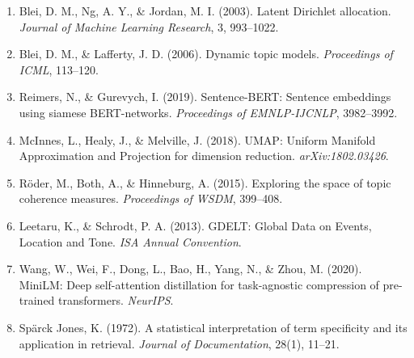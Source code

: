 \documentclass[12pt,a4paper]{article}
\begin{document}
\begin{enumerate}[leftmargin=2em]
    \item Blei, D. M., Ng, A. Y., \& Jordan, M. I. (2003). Latent Dirichlet allocation.
          \textit{Journal of Machine Learning Research}, 3, 993--1022.

    \item Blei, D. M., \& Lafferty, J. D. (2006). Dynamic topic models.
          \textit{Proceedings of ICML}, 113--120.

    \item Reimers, N., \& Gurevych, I. (2019). Sentence-BERT: Sentence embeddings using
          siamese BERT-networks. \textit{Proceedings of EMNLP-IJCNLP}, 3982--3992.

    \item McInnes, L., Healy, J., \& Melville, J. (2018). UMAP: Uniform Manifold
          Approximation and Projection for dimension reduction.
          \textit{arXiv:1802.03426}.

    \item Röder, M., Both, A., \& Hinneburg, A. (2015). Exploring the space of topic
          coherence measures. \textit{Proceedings of WSDM}, 399--408.

    \item Leetaru, K., \& Schrodt, P. A. (2013). GDELT: Global Data on Events, Location
          and Tone. \textit{ISA Annual Convention}.

    \item Wang, W., Wei, F., Dong, L., Bao, H., Yang, N., \& Zhou, M. (2020).
          MiniLM: Deep self-attention distillation for task-agnostic compression
          of pre-trained transformers. \textit{NeurIPS}.

    \item Spärck Jones, K. (1972). A statistical interpretation of term specificity
          and its application in retrieval.
          \textit{Journal of Documentation}, 28(1), 11--21.
\end{enumerate}
\end{document}
